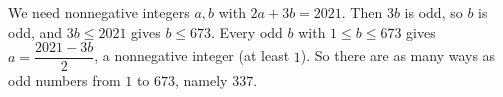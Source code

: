 We need nonnegative integers $a,b$ with $2a+3b=2021$. Then $3b$ is odd, so $b$ is odd, and $3b\le2021$ gives $b\le673$. Every odd $b$ with $1\le b\le673$ gives $a=\dfrac{2021-3b}{2}$, a nonnegative integer (at least $1$). So there are as many ways as odd numbers from $1$ to $673$, namely $\boxed{337}$.
